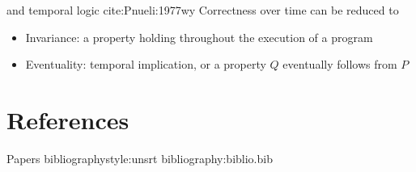 \documentclass[aspectratio=169]{beamer}
\begin{document}
\begin{frame}[label={sec:orgb912b54}]{and temporal logic cite:Pnueli:1977wy}
Correctness over time can be reduced to

\begin{itemize}
\item \alert{Invariance}: a property holding throughout the execution of a program

\item \alert{Eventuality}: temporal implication, or a property \(Q\) eventually follows from \(P\)
\end{itemize}
\end{frame}










\section{References}
\label{sec:org34df834}
\begin{frame}[label={sec:org91b3cde}]{Papers}
bibliographystyle:unsrt
bibliography:biblio.bib
\end{frame}
\end{document}
